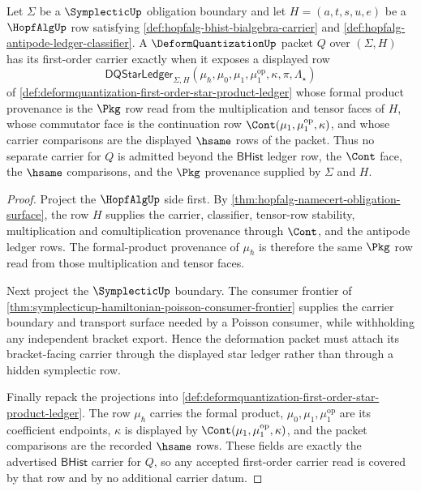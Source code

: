\begin{theorem}
\label{thm:deformquantization-star-ledger-carrier-obligation}
Let $\Sigma$ be a $\SymplecticUp$ obligation boundary and let $H=(a,t,s,u,e)$ be a $\HopfAlgUp$ row satisfying \autoref{def:hopfalg-bhist-bialgebra-carrier} and \autoref{def:hopfalg-antipode-ledger-classifier}. A $\DeformQuantizationUp$ packet $Q$ over $(\Sigma,H)$ has its first-order carrier exactly when it exposes a displayed row
$$
\mathsf{DQStarLedger}_{\Sigma,H}(\mu_\hbar,\mu_0,\mu_1,\mu_1^{\mathrm{op}},\kappa,\pi,\Lambda_\star)
$$
of \autoref{def:deformquantization-first-order-star-product-ledger} whose formal product provenance is the $\Pkg$ row read from the multiplication and tensor faces of $H$, whose commutator face is the continuation row $\Cont(\mu_1,\mu_1^{\mathrm{op}},\kappa)$, and whose carrier comparisons are the displayed $\hsame$ rows of the packet. Thus no separate carrier for $Q$ is admitted beyond the $\mathsf{BHist}$ ledger row, the $\Cont$ face, the $\hsame$ comparisons, and the $\Pkg$ provenance supplied by $\Sigma$ and $H$.
\end{theorem}
\begin{proof}
Project the $\HopfAlgUp$ side first. By \autoref{thm:hopfalg-namecert-obligation-surface}, the row $H$ supplies the carrier, classifier, tensor-row stability, multiplication and comultiplication provenance through $\Cont$, and the antipode ledger rows. The formal-product provenance of $\mu_\hbar$ is therefore the same $\Pkg$ row read from those multiplication and tensor faces.

Next project the $\SymplecticUp$ boundary. The consumer frontier of \autoref{thm:symplecticup-hamiltonian-poisson-consumer-frontier} supplies the carrier boundary and transport surface needed by a Poisson consumer, while withholding any independent bracket export. Hence the deformation packet must attach its bracket-facing carrier through the displayed star ledger rather than through a hidden symplectic row.

Finally repack the projections into \autoref{def:deformquantization-first-order-star-product-ledger}. The row $\mu_\hbar$ carries the formal product, $\mu_0,\mu_1,\mu_1^{\mathrm{op}}$ are its coefficient endpoints, $\kappa$ is displayed by $\Cont(\mu_1,\mu_1^{\mathrm{op}},\kappa)$, and the packet comparisons are the recorded $\hsame$ rows. These fields are exactly the advertised $\mathsf{BHist}$ carrier for $Q$, so any accepted first-order carrier read is covered by that row and by no additional carrier datum.
\end{proof}

